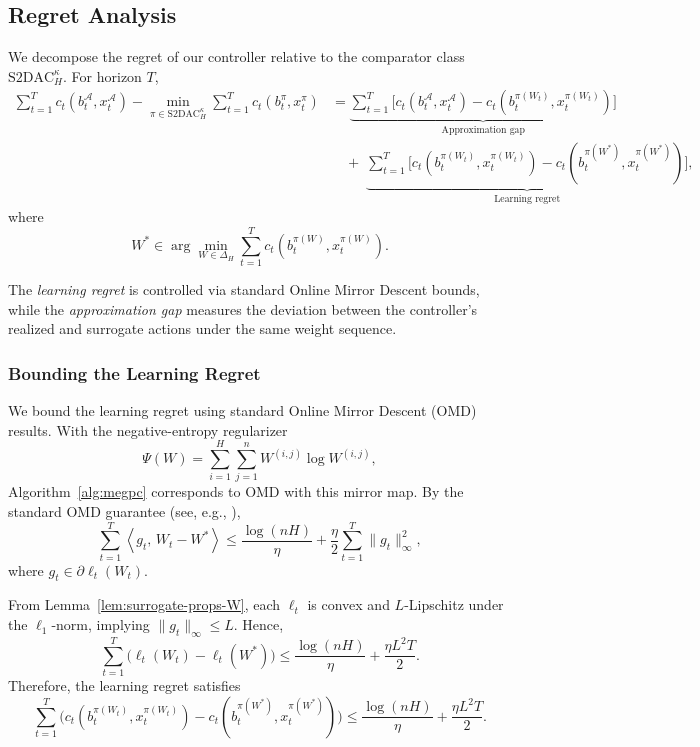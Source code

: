 \subsection{Regret Analysis}

We decompose the regret of our controller relative to the comparator class \(\mathrm{S2DAC}_H^\kappa\).  
For horizon \(T\),
\begin{align*}
\sum_{t=1}^T c_t(b_t^\mathcal{A},x_t^\mathcal{A})
- \min_{\pi\in\mathrm{S2DAC}_H^\kappa} \sum_{t=1}^T c_t(b_t^\pi,x_t^\pi)
&=
\underbrace{\sum_{t=1}^T \big[ c_t(b_t^\mathcal{A},x_t^\mathcal{A}) - c_t(b_t^{\pi(W_t)},x_t^{\pi(W_t)}) \big]}_{\text{Approximation gap}} \\
&\quad+\;
\underbrace{\sum_{t=1}^T \big[ c_t(b_t^{\pi(W_t)},x_t^{\pi(W_t)}) - c_t(b_t^{\pi(W^*)},x_t^{\pi(W^*)}) \big]}_{\text{Learning regret}},
\end{align*}
where
\[
W^* \in \arg\min_{W\in\Delta_H} \sum_{t=1}^T c_t(b_t^{\pi(W)},x_t^{\pi(W)}).
\]

The \textit{learning regret} is controlled via standard Online Mirror Descent bounds, while the \textit{approximation gap} measures the deviation between the controller’s realized and surrogate actions under the same weight sequence.

\subsubsection{Bounding the Learning Regret}

We bound the learning regret using standard Online Mirror Descent (OMD) results.  
With the negative-entropy regularizer
\[
\Psi(W) = \sum_{i=1}^H \sum_{j=1}^n W^{(i,j)} \log W^{(i,j)},
\]
Algorithm~\ref{alg:megpc} corresponds to OMD with this mirror map. By the standard OMD guarantee (see, e.g., \cite{orabona_modern_2023}),
\[
\sum_{t=1}^T 
\left\langle g_t,\, W_t - W^* \right\rangle
\le
\frac{\log(nH)}{\eta}
+ \frac{\eta}{2}\sum_{t=1}^T \|g_t\|_\infty^2,
\]
where \(g_t \in \partial \ell_t(W_t)\).

From Lemma~\ref{lem:surrogate-props-W}, each \(\ell_t\) is convex and \(L\)-Lipschitz under the \(\ell_1\)-norm, implying \(\|g_t\|_\infty \le L\).  
Hence,
\[
\sum_{t=1}^T \bigl(\ell_t(W_t) - \ell_t(W^*)\bigr)
\le
\frac{\log(nH)}{\eta}
+ \frac{\eta L^2 T}{2}.
\]
Therefore, the learning regret satisfies
\begin{equation}
\label{eq:omd-W}
\sum_{t=1}^T 
\Big(
c_t(b_t^{\pi(W_t)},x_t^{\pi(W_t)})
-
c_t(b_t^{\pi(W^*)},x_t^{\pi(W^*)})
\Big)
\le
\frac{\log(nH)}{\eta}
+ \frac{\eta L^2 T}{2}.
\end{equation}


